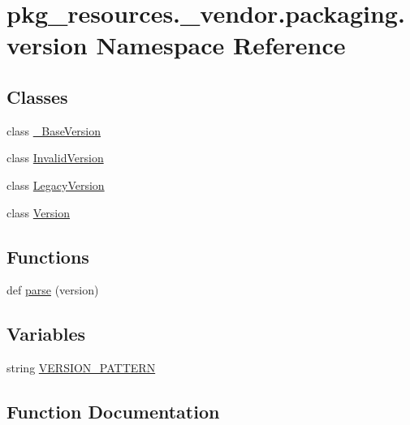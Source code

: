 \hypertarget{namespacepkg__resources_1_1__vendor_1_1packaging_1_1version}{}\section{pkg\+\_\+resources.\+\_\+vendor.\+packaging.\+version Namespace Reference}
\label{namespacepkg__resources_1_1__vendor_1_1packaging_1_1version}
\subsection*{Classes}
\begin{DoxyCompactItemize}
\item 
class \hyperlink{classpkg__resources_1_1__vendor_1_1packaging_1_1version_1_1___base_version}{\+\_\+\+Base\+Version}
\item 
class \hyperlink{classpkg__resources_1_1__vendor_1_1packaging_1_1version_1_1_invalid_version}{Invalid\+Version}
\item 
class \hyperlink{classpkg__resources_1_1__vendor_1_1packaging_1_1version_1_1_legacy_version}{Legacy\+Version}
\item 
class \hyperlink{classpkg__resources_1_1__vendor_1_1packaging_1_1version_1_1_version}{Version}
\end{DoxyCompactItemize}
\subsection*{Functions}
\begin{DoxyCompactItemize}
\item 
def \hyperlink{namespacepkg__resources_1_1__vendor_1_1packaging_1_1version_a478a09ba4a7b4fe5ac102489cfd64a19}{parse} (version)
\end{DoxyCompactItemize}
\subsection*{Variables}
\begin{DoxyCompactItemize}
\item 
string \hyperlink{namespacepkg__resources_1_1__vendor_1_1packaging_1_1version_aac23a877401bd51d980f997645b2acc2}{V\+E\+R\+S\+I\+O\+N\+\_\+\+P\+A\+T\+T\+E\+RN}
\end{DoxyCompactItemize}


\subsection{Function Documentation}
\mbox{\label{namespacepkg__resources_1_1__vendor_1_1packaging_1_1version_a478a09ba4a7b4fe5ac102489cfd64a19}} 
